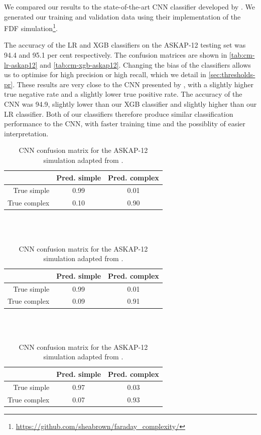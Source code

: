     We compared our results to the state-of-the-art CNN classifier developed by \citet{brown_classifying_2018}. We generated our training and validation data using their implementation of the FDF simulation\footnote{\url{https://github.com/sheabrown/faraday_complexity/}}.

    The accuracy of the LR and XGB classifiers on the ASKAP-12 testing set was 94.4 and 95.1 per cent respectively. The confusion matrices are shown in \autoref{tab:cm-lr-askap12} and \autoref{tab:cm-xgb-askap12}. Changing the bias of the classifiers allows us to optimise for high precision or high recall, which we detail in \autoref{sec:thresholds-pr}. These results are very close to the CNN presented by \citet{brown_classifying_2018}, with a slightly higher true negative rate and a slightly lower true positive rate. The accuracy of the CNN was 94.9, slightly lower than our XGB classifier and slightly higher than our LR classifier. Both of our classifiers therefore produce similar classification performance to the CNN, with faster training time and the possiblity of easier interpretation.

    \begin{table}
      \caption{\label{tab:faraday-cm-lr-askap12} Logistic regression confusion matrix for the ASKAP-12 simulation.}
      \begin{tabular}{r|cc}
        \hline\hline
        & Pred. simple & Pred. complex \\\hline
        True simple & 0.99 & 0.01 \\
        True complex & 0.10 & 0.90 \\
        \hline\hline
      \end{tabular}\\
      \\
      \caption{\label{tab:faraday-cm-xgb-askap12} XGB confusion matrix for the ASKAP-12 simulation.}
      \begin{tabular}{r|cc}
        \hline\hline
        & Pred. simple & Pred. complex \\\hline
        True simple & 0.99 & 0.01 \\
        True complex & 0.09 & 0.91 \\
        \hline\hline
      \end{tabular}\\
      \\
      \caption{\label{tab:faraday-cm-brown} CNN confusion matrix for the ASKAP-12 simulation adapted from \citet{brown_classifying_2018}.}
      \begin{tabular}{r|cc}
        \hline\hline
        & Pred. simple & Pred. complex \\\hline
        True simple & 0.97 & 0.03 \\
        True complex & 0.07 & 0.93 \\
        \hline\hline
      \end{tabular}
    \end{table}

